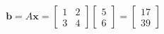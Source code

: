 \documentclass[preview]{standalone}
\begin{document}
\begin{align*}
\mathbf{b} = A\mathbf{x} = \begin{bmatrix} 1 & 2 \\ 3 & 4 \end{bmatrix} \begin{bmatrix} 5 \\ 6 \end{bmatrix} = \begin{bmatrix} 17 \\ 39 \end{bmatrix}
\end{align*}
\end{document}
